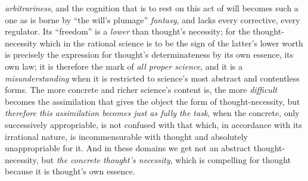 \documentclass[12pt,a4paper]{book}
\begin{document}
\emph{arbitrariness}, and the cognition that is to rest on this act of will becomes such a one as
is borne by ``the will's plumage'' \emph{fantasy}, and lacks every corrective, every regulator. Its
``freedom'' is a \emph{lower} than thought's necessity; for the thought-necessity which in the rational
science is to be the sign of the latter's lower worth is precisely the expression for thought's
determinateness by its own essence, its own law; it is therefore the mark of \emph{all proper
science}, and it is a \emph{misunderstanding} when it is restricted to science's most abstract
and contentless forms. The more concrete and richer science's content is, the more \emph{difficult}
becomes the assimilation that gives the object the form of thought-necessity, but \emph{therefore this
assimilation becomes just as fully the task}, when the concrete, only successively appropriable,
is not confused with that which, in accordance with its irrational nature, is incommensurable
with thought and absolutely unappropriable for it. And in these domains we get not an abstract
thought-necessity, but \emph{the concrete thought's necessity}, which is compelling for thought
because it is thought's own essence.
\end{document}

